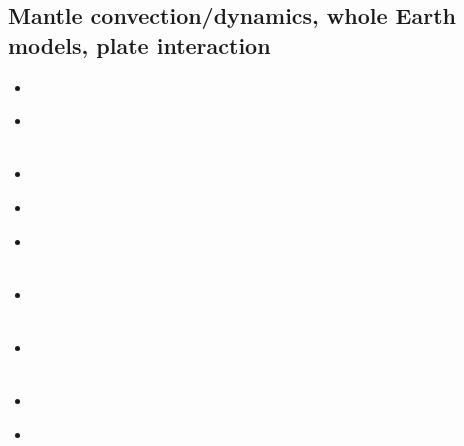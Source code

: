 \subsection{Mantle convection/dynamics, whole Earth models, plate interaction}

\begin{scriptsize}
\begin{itemize}
\item[\nineteensixtyseven] 
\textcite{tuox67} \\
\item[\nineteenseventyone] 
\textcite{totu71} \\
\textcite{buwh71} \\
\item[\nineteenseventytwo] 
\textcite{pelt72} \\
\item[\nineteenseventythree] 
\textcite{mcrw73} \\
\item[\nineteenseventyfour] 
\textcite{youn74} \\
\textcite{mcrw74} \\
\item[\nineteenseventyfive] 
\textcite{hemw75} \\
\textcite{buss75} \\
\item[\nineteenseventysix] 
\textcite{mcri76} \\
\textcite{sath76} \\
\item[\nineteenseventyseven] 
\textcite{yusc77} \\
\item[\nineteenseventyeight] 
\textcite{mahz78} \\ 
\textcite{hsui78} \\
\textcite{haoc78} \\
\textcite{pamc78} \\

\end{itemize}
\end{scriptsize}

